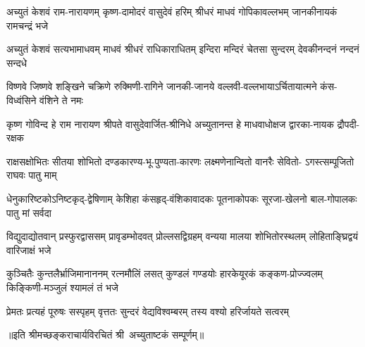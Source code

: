 

\fourlineindentedshloka
{अच्युतं केशवं राम-नारायणम्}
{कृष्ण-दामोदरं वासुदेवं हरिम्}
{श्रीधरं माधवं गोपिकावल्लभम्}
{जानकीनायकं रामचन्द्रं भजे}

\fourlineindentedshloka
{अच्युतं केशवं सत्यभामाधवम्}
{माधवं श्रीधरं राधिकाराधितम्}
{इन्दिरा मन्दिरं चेतसा सुन्दरम्}
{देवकीनन्दनं नन्दनं सन्दधे}

\fourlineindentedshloka
{विष्णवे जिष्णवे शङ्खिने चक्रिणे}
{रुक्मिणी-रागिने जानकी-जानये}
{वल्लवी-वल्लभायाऽर्चितायात्मने}
{कंस-विध्वंसिने वंशिने ते नमः}

\fourlineindentedshloka
{कृष्ण गोविन्द हे राम नारायण}
{श्रीपते वासुदेवार्जित-श्रीनिधे}
{अच्युतानन्त हे माधवाधोक्षज}
{द्वारका-नायक द्रौपदी-रक्षक}

\fourlineindentedshloka
{राक्षसक्षोभितः सीतया शोभितो}
{दण्डकारण्य-भू-पुण्यता-कारणः}
{लक्ष्मणेनान्वितो वानरैः सेवितो-}
{ऽगस्त्सम्पूजितो राघवः पातु माम्}

\fourlineindentedshloka
{धेनुकारिष्टकोऽनिष्टकृद्-द्वेषिणाम्}
{केशिहा कंसहृद्-वंशिकावादकः}
{पूतनाकोपकः सूरजा-खेलनो}
{बाल-गोपालकः पातु मां सर्वदा}

\fourlineindentedshloka
{विद्युदाद्योतवान् प्रस्फुरद्वाससम्}
{प्रावृडम्भोदवत् प्रोल्लसद्विग्रहम्}
{वन्यया मालया शोभितोरस्थलम्}
{लोहिताङ्घ्रिद्वयं वारिजाक्षं भजे}

\fourlineindentedshloka
{कुञ्चितैः कुन्तलैर्भ्राजिमानाननम्}
{रत्नमौलिं लसत् कुण्डलं गण्डयोः}
{हारकेयूरकं कङ्कण-प्रोज्ज्वलम्}
{किङ्किणी-मञ्जुलं श्यामलं तं भजे}

{प्रेमतः प्रत्यहं पूरुषः सस्पृहम्}
{वृत्ततः सुन्दरं वेद्यविश्वम्बरम्}
{तस्य वश्यो हरिर्जायते सत्वरम्}

॥इति श्रीमच्छङ्कराचार्यविरचितं श्री~अच्युताष्टकं सम्पूर्णम्॥